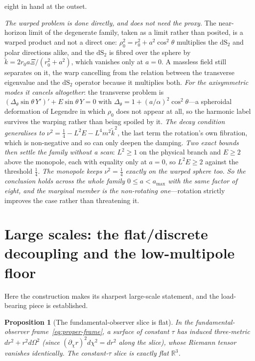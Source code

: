 \documentclass[11pt,a4paper]{article}
\theoremstyle{plain}
\newtheorem{proposition}{Proposition}
\theoremstyle{definition}
\theoremstyle{remark}
\newcommand{\dS}{\mathrm{dS}}
\begin{document}
eight in hand at the outset.

\emph{The warped problem is done directly, and does not need the proxy.} The
near-horizon limit of the degenerate family, taken as a limit rather than posited, is a warped
product and not a direct one: $\rho_0^{2}=r_{0}^{2}+a^{2}\cos^{2}\theta$ multiplies the $\dS_2$ and
polar directions alike, and the $\dS_2$ is fibred over the sphere by
$\tilde k=2r_{0}a\Xi/(r_{0}^{2}+a^{2})$, which vanishes only at $a=0$. A massless field still
separates on it, the warp cancelling from the relation between the transverse eigenvalue and the
$\dS_2$ operator because it multiplies both. \emph{For the axisymmetric modes it cancels
altogether}: the transverse problem is $(\Delta_\theta\sin\theta\,Y')'+E\sin\theta\,Y=0$ with
$\Delta_\theta=1+(a/\alpha)^{2}\cos^{2}\theta$---a spheroidal deformation of Legendre in which
$\rho_0$ does not appear at all, so the harmonic label survives the warping rather than being
spoiled by it. \emph{The decay condition generalises to}
$\nu^{2}=\tfrac14-L^{2}E-L^{4}m^{2}\tilde k^{2}$, the last term the rotation's own fibration, which
is non-negative and so can only deepen the damping. \emph{Two exact bounds then settle the family
without a scan}: $L^{2}\ge1$ on the physical branch and $E\ge2$ above the monopole, each with
equality only at $a=0$, so $L^{2}E\ge2$ against the threshold $\tfrac14$. \emph{The monopole keeps
$\nu^{2}=\tfrac14$ exactly on the warped sphere too.} \emph{So the conclusion holds across the whole
family $0\le a<a_{\max}$ with the same factor of eight, and the marginal member is the
non-rotating one}---rotation strictly improves the case rather than threatening
it.

\section{Large scales: the flat/discrete decoupling and the low-multipole floor}\label{sec:largescale}

Here the construction makes its sharpest large-scale statement, and the load-bearing piece is established.

\begin{proposition}[The fundamental-observer slice is flat]\label{prop:flat}
In the fundamental-observer frame~\eqref{eq:proper-frame}, a surface of constant $\tau$ has induced three-metric $dr^2+r^2d\Omega^2$ (since $(\partial_\chi r)^2d\chi^2=dr^2$ along the slice), whose Riemann tensor vanishes identically. The constant-$\tau$ slice is exactly flat $\mathbb{R}^3$.
\end{proposition}
\end{document}
